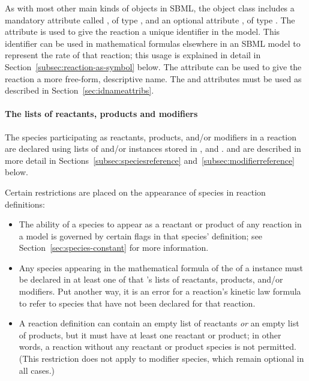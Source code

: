 As with most other main kinds of objects in SBML, the
\Reaction object class
includes a mandatory attribute called , of type
, and an optional attribute , of type
.  The  attribute is used to give the
reaction a unique identifier in the model.  This identifier can be
used in mathematical formulas elsewhere in an SBML model to
represent the rate of that reaction; this usage is explained in
detail in Section~\ref{subsec:reaction-as-symbol} below.  The
 attribute can be used to give the reaction a more
free-form, descriptive name.  The  and 
attributes must be used as described in
Section~\ref{sec:idnameattribs}.


\paragraph{The lists of reactants, products and modifiers}

The species participating as reactants, products, and/or modifiers
in a reaction are declared using lists of \SpeciesReference and/or
\ModifierSpeciesReference instances stored in
,  and
.
\SpeciesReference and
\ModifierSpeciesReference are described in more detail
in Sections~\ref{subsec:speciesreference}
and~\ref{subsec:modifierreference} below.

Certain restrictions are placed on the appearance of species in
reaction definitions:
\begin{itemize}
  
\item The ability of a species to appear as a reactant or product
  of any reaction in a model is governed by certain flags in that
  species' definition; see Section~\ref{sec:species-constant} for
  more information.
  
\item Any species appearing in the mathematical formula of the
   of a \Reaction instance must be declared in
  at least one of that \Reaction's lists of reactants, products,
  and/or modifiers.  Put another way, it is an error for a
  reaction's kinetic law formula to refer to species that have not
  been declared for that reaction.
  
\item A reaction definition can contain an empty list of reactants
  \emph{or} an empty list of products, but it must have at least
  one reactant or product; in other words, a reaction without any
  reactant or product species is not permitted.  (This restriction
  does not apply to modifier species, which remain optional in all
  cases.)

\end{itemize}


